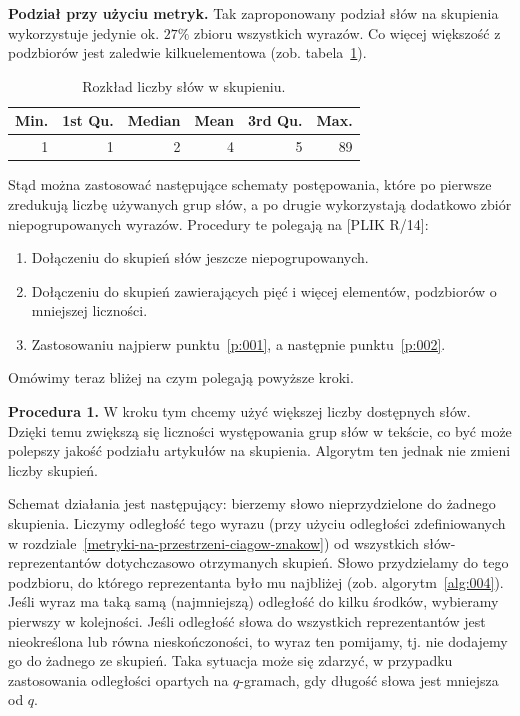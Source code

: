 \documentclass{praca1}
\begin{document}
\textbf{Podział przy użyciu metryk.}
Tak zaproponowany podział słów na skupienia wykorzystuje jedynie ok. $27\%$ zbioru wszystkich wyrazów. Co więcej większość z podzbiorów jest zaledwie kilkuelementowa (zob. tabela~\ref{tab:004}). 

\begin{table}[!h]
\centering
\begin{tabular}{|r|r|r|r|r|r|}
  \hline
Min. & 1st Qu. & Median & Mean & 3rd Qu. & Max. \\ 
  \hline
1 & 1 & 2 & 4 & 5 & 89 \\ 
   \hline
\end{tabular}
\caption{Rozkład liczby słów w skupieniu.}
\label{tab:004}
\end{table}


Stąd można zastosować następujące schematy postępowania, które po pierwsze zredukują liczbę używanych grup słów, a po drugie wykorzystają dodatkowo zbiór niepogrupowanych wyrazów. Procedury te polegają na [PLIK R/14]:
\begin{enumerate}
\item\label{p:001} Dołączeniu do skupień słów jeszcze niepogrupowanych.
\item\label{p:002} Dołączeniu do skupień zawierających pięć i więcej elementów, podzbiorów o mniejszej liczności.
\item Zastosowaniu najpierw punktu~\ref{p:001}, a następnie punktu~\ref{p:002}.
\end{enumerate}

Omówimy teraz bliżej na czym polegają powyższe kroki.

\textbf{Procedura 1.} W kroku tym chcemy użyć większej liczby dostępnych słów. Dzięki temu zwiększą się liczności występowania grup słów w tekście, co być może polepszy jakość podziału artykułów na skupienia. Algorytm ten jednak nie zmieni liczby skupień. 

Schemat działania jest następujący: bierzemy słowo nieprzydzielone do żadnego skupienia. Liczymy odległość tego wyrazu (przy użyciu odległości zdefiniowanych w rozdziale~\ref{metryki-na-przestrzeni-ciagow-znakow}) od wszystkich słów-reprezentantów dotychczasowo otrzymanych skupień. Słowo przydzielamy do tego podzbioru, do którego reprezentanta było mu najbliżej (zob. algorytm~\ref{alg:004}). Jeśli wyraz ma taką samą (najmniejszą) odległość do kilku środków, wybieramy pierwszy w kolejności. Jeśli odległość słowa do wszystkich reprezentantów jest nieokreślona lub równa nieskończoności, to wyraz ten pomijamy, tj. nie dodajemy go do żadnego ze skupień. Taka sytuacja może się zdarzyć, w przypadku zastosowania odległości opartych na $q$-gramach, gdy długość słowa jest mniejsza od $q$.
\end{document}
